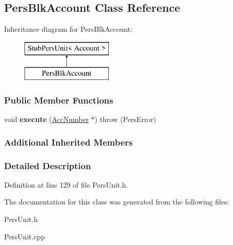 \hypertarget{classPersBlkAccount}{\subsection{Pers\-Blk\-Account Class Reference}
\label{d6/d7d/classPersBlkAccount}
}
Inheritance diagram for Pers\-Blk\-Account\-:\begin{figure}[H]
\begin{center}
\leavevmode
\includegraphics[height=2.000000cm]{d6/d7d/classPersBlkAccount}
\end{center}
\end{figure}
\subsubsection*{Public Member Functions}
\begin{DoxyCompactItemize}
\item 
\hypertarget{classPersBlkAccount_ac194c547436f62695c246d1f32e7574c}{void {\bfseries execute} (\hyperlink{classAccNumber}{Acc\-Number} $\ast$)  throw (\-Pers\-Error)}\label{d6/d7d/classPersBlkAccount_ac194c547436f62695c246d1f32e7574c}

\end{DoxyCompactItemize}
\subsubsection*{Additional Inherited Members}


\subsubsection{Detailed Description}


Definition at line 129 of file Pers\-Unit.\-h.



The documentation for this class was generated from the following files\-:\begin{DoxyCompactItemize}
\item 
Pers\-Unit.\-h\item 
Pers\-Unit.\-cpp\end{DoxyCompactItemize}
